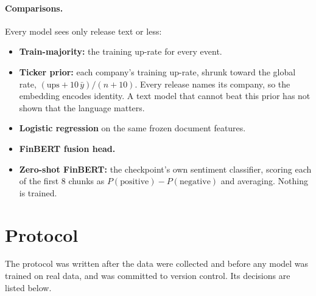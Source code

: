 \documentclass[11pt]{article}
\begin{document}
\paragraph{Comparisons.} Every model sees only release text or less:
\begin{itemize}
  \item \textbf{Train-majority:} the training up-rate for every event.
  \item \textbf{Ticker prior:} each company's training up-rate, shrunk toward the global rate,
  $(\text{ups}+10\,\bar y)/(n+10)$. Every release names its company, so the embedding encodes identity.
  A text model that cannot beat this prior has not shown that the language matters.
  \item \textbf{Logistic regression} on the same frozen document features.
  \item \textbf{FinBERT fusion head.}
  \item \textbf{Zero-shot FinBERT:} the checkpoint's own sentiment classifier, scoring each of the
  first 8 chunks as $P(\text{positive})-P(\text{negative})$ and averaging. Nothing is trained.
\end{itemize}

\section{Protocol}\label{sec:protocol}
The protocol was written after the data were collected and before any model was trained on real
data, and was committed to version control. Its decisions are listed below.
\end{document}
